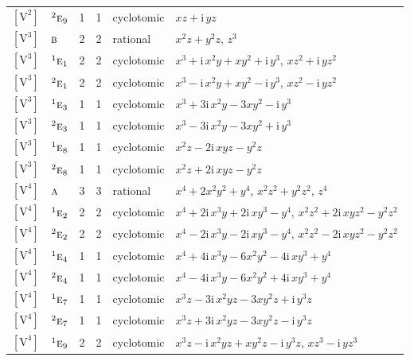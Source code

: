 \documentclass[10pt,a4paper]{article}
\numberwithin{equation}{section}
\newcommand{\irr}[1]{\text{\normalfont\scshape #1}}
\newcommand{\conjpair}[1]{{}^{#1}}
\newcommand{\iunit}{\mathrm{i}}
\newcommand{\jahn}[1]{\mathrm{#1}}
\newlength{\fillwidth}\newlength{\cellwidth}\newlength{\colwidth}
\begin{document}
{\begin{longtable}{@{}llrrl>{\RaggedRight\arraybackslash}p{\fillwidth}@{}}
$\jahn{[V^{2}]}$ & $\conjpair{2}\irr{e}_{9}$ & 1 & 1 & cyclotomic & $xz + \iunit{}\,yz$\\
$\jahn{[V^{3}]}$ & $\irr{b}$ & 2 & 2 & rational & $x^{2}z + y^{2}z$, $z^{3}$\\
$\jahn{[V^{3}]}$ & $\conjpair{1}\irr{e}_{1}$ & 2 & 2 & cyclotomic & $x^{3} + \iunit{}\,x^{2}y + xy^{2} + \iunit{}\,y^{3}$, $xz^{2} + \iunit{}\,yz^{2}$\\
$\jahn{[V^{3}]}$ & $\conjpair{2}\irr{e}_{1}$ & 2 & 2 & cyclotomic & $x^{3} - \iunit{}\,x^{2}y + xy^{2} - \iunit{}\,y^{3}$, $xz^{2} - \iunit{}\,yz^{2}$\\
$\jahn{[V^{3}]}$ & $\conjpair{1}\irr{e}_{3}$ & 1 & 1 & cyclotomic & $x^{3} + 3\iunit{}\,x^{2}y - 3xy^{2} - \iunit{}\,y^{3}$\\
$\jahn{[V^{3}]}$ & $\conjpair{2}\irr{e}_{3}$ & 1 & 1 & cyclotomic & $x^{3} - 3\iunit{}\,x^{2}y - 3xy^{2} + \iunit{}\,y^{3}$\\
$\jahn{[V^{3}]}$ & $\conjpair{1}\irr{e}_{8}$ & 1 & 1 & cyclotomic & $x^{2}z - 2\iunit{}\,xyz - y^{2}z$\\
$\jahn{[V^{3}]}$ & $\conjpair{2}\irr{e}_{8}$ & 1 & 1 & cyclotomic & $x^{2}z + 2\iunit{}\,xyz - y^{2}z$\\
$\jahn{[V^{4}]}$ & $\irr{a}$ & 3 & 3 & rational & $x^{4} + 2x^{2}y^{2} + y^{4}$, $x^{2}z^{2} + y^{2}z^{2}$, $z^{4}$\\
$\jahn{[V^{4}]}$ & $\conjpair{1}\irr{e}_{2}$ & 2 & 2 & cyclotomic & $x^{4} + 2\iunit{}\,x^{3}y + 2\iunit{}\,xy^{3} - y^{4}$, $x^{2}z^{2} + 2\iunit{}\,xyz^{2} - y^{2}z^{2}$\\
$\jahn{[V^{4}]}$ & $\conjpair{2}\irr{e}_{2}$ & 2 & 2 & cyclotomic & $x^{4} - 2\iunit{}\,x^{3}y - 2\iunit{}\,xy^{3} - y^{4}$, $x^{2}z^{2} - 2\iunit{}\,xyz^{2} - y^{2}z^{2}$\\
$\jahn{[V^{4}]}$ & $\conjpair{1}\irr{e}_{4}$ & 1 & 1 & cyclotomic & $x^{4} + 4\iunit{}\,x^{3}y - 6x^{2}y^{2} - 4\iunit{}\,xy^{3} + y^{4}$\\
$\jahn{[V^{4}]}$ & $\conjpair{2}\irr{e}_{4}$ & 1 & 1 & cyclotomic & $x^{4} - 4\iunit{}\,x^{3}y - 6x^{2}y^{2} + 4\iunit{}\,xy^{3} + y^{4}$\\
$\jahn{[V^{4}]}$ & $\conjpair{1}\irr{e}_{7}$ & 1 & 1 & cyclotomic & $x^{3}z - 3\iunit{}\,x^{2}yz - 3xy^{2}z + \iunit{}\,y^{3}z$\\
$\jahn{[V^{4}]}$ & $\conjpair{2}\irr{e}_{7}$ & 1 & 1 & cyclotomic & $x^{3}z + 3\iunit{}\,x^{2}yz - 3xy^{2}z - \iunit{}\,y^{3}z$\\
$\jahn{[V^{4}]}$ & $\conjpair{1}\irr{e}_{9}$ & 2 & 2 & cyclotomic & $x^{3}z - \iunit{}\,x^{2}yz + xy^{2}z - \iunit{}\,y^{3}z$, $xz^{3} - \iunit{}\,yz^{3}$\\

\end{longtable}}
\end{document}
